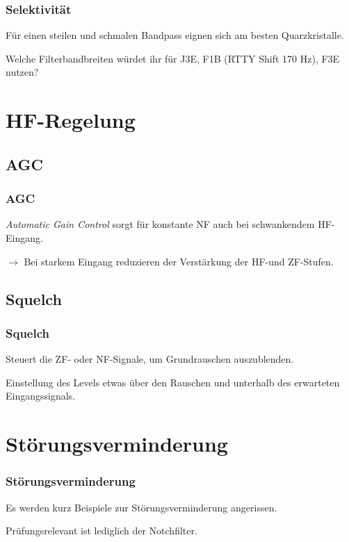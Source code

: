 \begin{frame}
    \frametitle{Selektivität}

    Für einen steilen und schmalen Bandpass eignen sich am besten
    Quarzkristalle.

    Welche Filterbandbreiten würdet ihr für J3E, F1B (RTTY Shift 170 Hz), F3E nutzen?

\end{frame}

\section{HF-Regelung}

\subsection{AGC}

\begin{frame}
    \frametitle{AGC}

    \emph{Automatic Gain Control} sorgt für konstante NF auch bei schwankendem
    HF-Eingang.

    \bigskip

    $\rightarrow$ Bei starkem Eingang reduzieren der Verstärkung der HF-und ZF-Stufen.

\end{frame}

\subsection{Squelch}

\begin{frame}
    \frametitle{Squelch}

    Steuert die ZF- oder NF-Signale, um Grundrauschen auszublenden.

    \bigskip

    Einstellung des Levels etwas über den Rauschen und unterhalb des erwarteten
    Eingangssignals.

\end{frame}

\section[Störungsverm.]{Störungsverminderung}

\begin{frame}
    \frametitle{Störungsverminderung}

    Es werden kurz Beispiele zur Störungsverminderung angerissen.

    \bigskip

    Prüfungsrelevant ist lediglich der Notchfilter.

\end{frame}

